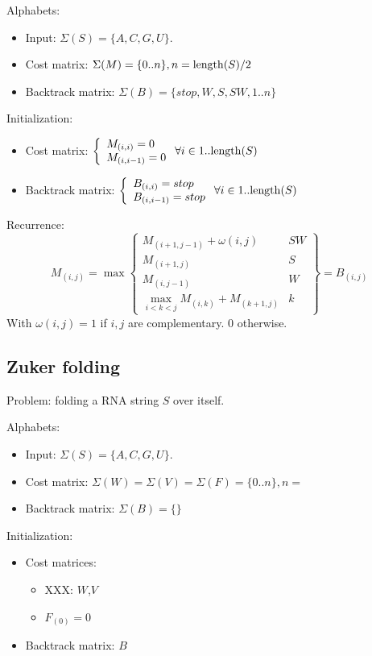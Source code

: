 \documentclass[11pt]{article}
\def\ul{\begin{itemize}}
\def\ule{\end{itemize}}
\begin{document}
Alphabets:\ul
\item Input: $\Sigma(S)=\{A,C,G,U\}$.
\item Cost matrix: $\Sigma(M)=\{0..n\}, n={\rm length}(S)/2$
\item Backtrack matrix: $\Sigma(B)=\{stop,W,S,SW, 1..n\}$
\ule

Initialization: \ul
\item Cost matrix: $\left\{\begin{array}{l} M_{(i,i)}=0 \\ M_{(i,i-1)}=0 \end{array}\right. \forall i \in 1..{\rm length}(S)$
\item Backtrack matrix: $\left\{\begin{array}{l} B_{(i,i)}=stop \\ B_{(i,i-1)}=stop \end{array}\right.  \forall i \in 1..{\rm length}(S)$
\ule

Recurrence:
\[M_{(i,j)}=\max\left\{\begin{array}{l|l}
	M_{(i+1,j-1)}+\omega(i,j) & SW\\
	M_{(i+1,j)} & S\\
	M_{(i,j-1)} & W\\
	\max_{i<k<j}M_{(i,k)}+M_{(k+1,j)} & k
\end{array}\right\} = B_{(i,j)} \]
With $\omega(i,j)=1$ if $i,j$ are complementary. 0 otherwise.

\newpage
\subsection{Zuker folding}
Problem: folding a RNA string $S$ over itself.

Alphabets:\ul
\item Input: $\Sigma(S)=\{A,C,G,U\}$.
\item Cost matrix: $\Sigma(W)=\Sigma(V)=\Sigma(F)=\{0..n\},n=$
\item Backtrack matrix: $\Sigma(B)=\{\}$
\ule

Initialization:\ul
\item Cost matrices:\ul
	\item XXX: $W$,$V$
	\item $F_{(0)}=0$
\ule
\item Backtrack matrix: $B$
\ule
\end{document}
